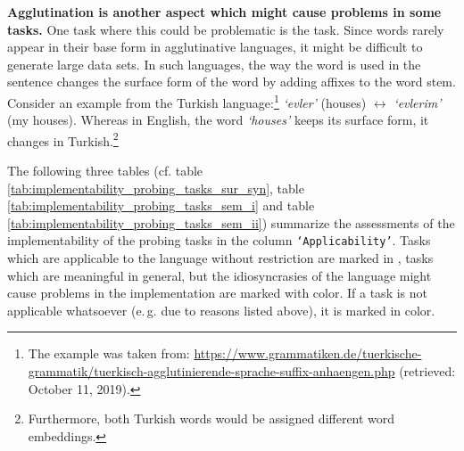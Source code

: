 \textbf{Agglutination is another aspect which might cause problems in some tasks.} One task where this could be problematic is the  task. Since words rarely appear in their base form in agglutinative languages, it might be difficult to generate large data sets. In such languages, the way the word is used in the sentence changes the surface form of the word by adding affixes to the word stem. Consider an example from the Turkish language:\footnote{The example was taken from: \url{https://www.grammatiken.de/tuerkische-grammatik/tuerkisch-agglutinierende-sprache-suffix-anhaengen.php} (retrieved: October 11, 2019).} \textit{`evler'} (houses) $\leftrightarrow$ \textit{`evlerim'} (my houses). Whereas in English, the word \textit{`houses'} keeps its surface form, it changes in Turkish.\footnote{Furthermore, both Turkish words would be assigned different word embeddings.}

The following three tables (cf. table \vref{tab:implementability_probing_tasks_sur_syn}, table \vref{tab:implementability_probing_tasks_sem_i} and table \vref{tab:implementability_probing_tasks_sem_ii}) summarize the assessments of the implementability of the probing tasks in the column \texttt{`Applicability'}. Tasks which are applicable to the language without restriction are marked in , tasks which are meaningful in general, but the idiosyncrasies of the language might cause problems in the implementation are marked with  color. If a task is not applicable whatsoever (e.\,g. due to reasons listed above), it is marked in  color.


